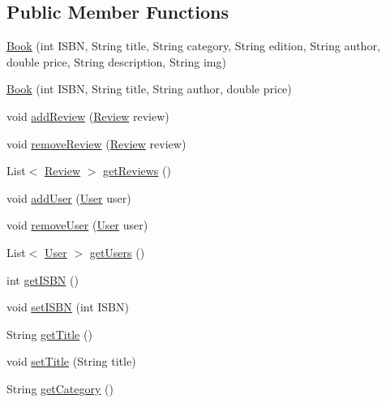 \subsection*{Public Member Functions}
\begin{DoxyCompactItemize}
\item 
\hyperlink{classserver_1_1data_1_1_book_aa625590266861f80eea48d26f979a483}{Book} (int I\+S\+BN, String title, String category, String edition, String author, double price, String description, String img)
\item 
\hyperlink{classserver_1_1data_1_1_book_a7cfac0c9e49e46d1a04746612ba1cb14}{Book} (int I\+S\+BN, String title, String author, double price)
\item 
void \hyperlink{classserver_1_1data_1_1_book_a8c44fbc3a0d63d0726cb967a3f65203c}{add\+Review} (\hyperlink{classserver_1_1data_1_1_review}{Review} review)
\item 
void \hyperlink{classserver_1_1data_1_1_book_a683834787e9b5010fff13c20b5843b55}{remove\+Review} (\hyperlink{classserver_1_1data_1_1_review}{Review} review)
\item 
List$<$ \hyperlink{classserver_1_1data_1_1_review}{Review} $>$ \hyperlink{classserver_1_1data_1_1_book_ab886271b0fb4f4d4ce3b05967820e118}{get\+Reviews} ()
\item 
void \hyperlink{classserver_1_1data_1_1_book_a0674e14f5b06b73f42fe846c8ad91c9e}{add\+User} (\hyperlink{classserver_1_1data_1_1_user}{User} user)
\item 
void \hyperlink{classserver_1_1data_1_1_book_a6fc896945914513ef9e333c09ef7dd13}{remove\+User} (\hyperlink{classserver_1_1data_1_1_user}{User} user)
\item 
List$<$ \hyperlink{classserver_1_1data_1_1_user}{User} $>$ \hyperlink{classserver_1_1data_1_1_book_a82b3f1dab8f578e8b48e05ca7953f5ae}{get\+Users} ()
\item 
int \hyperlink{classserver_1_1data_1_1_book_ab983c94721d2f5be590871cc0afd1d88}{get\+I\+S\+BN} ()
\item 
void \hyperlink{classserver_1_1data_1_1_book_a70559b3d9b96055ac293d0bb712f18e8}{set\+I\+S\+BN} (int I\+S\+BN)
\item 
String \hyperlink{classserver_1_1data_1_1_book_a74b0812ebfb23009cb65b4f4fda1f828}{get\+Title} ()
\item 
void \hyperlink{classserver_1_1data_1_1_book_aaab2ea46310686520765773057d0f511}{set\+Title} (String title)
\item 
String \hyperlink{classserver_1_1data_1_1_book_a7cc7af6515b25828f2caa978b4a4a720}{get\+Category} ()

\end{DoxyCompactItemize}
